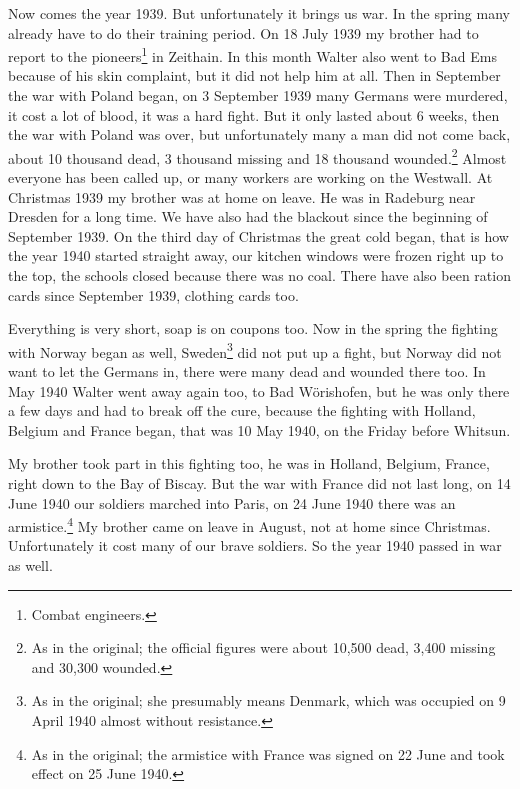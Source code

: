 \documentclass[a5paper,11pt,openany]{book}
\newcommand{\seite}[1]{\leavevmode\marginpar{\footnotesize\itshape\raggedright #1}\ignorespaces}
\begin{document}
Now comes the year 1939.
But unfortunately it brings us war.
In the spring many already have to do their training period.
On 18 July 1939 my brother had to report to the pioneers\footnote{Combat engineers.} in Zeithain.
In this month
\seite{47}
Walter also went to Bad Ems because of his skin complaint,
  but it did not help him at all.
Then in September the war with Poland began, on 3 September 1939 many Germans were murdered,
  it cost a lot of blood, it was a hard fight.
But it only lasted about 6 weeks, then the war with Poland was over, but unfortunately many a man did not come back,
  about 10 thousand dead, 3 thousand missing and 18 thousand wounded.\footnote{As in the original; the official figures were about 10,500 dead, 3,400 missing and 30,300 wounded.}
Almost everyone has been
\seite{48}
called up, or many workers are working on the Westwall.
At Christmas 1939 my brother was at home on leave.
He was in Radeburg near Dresden for a long time.
We have also had the blackout since the beginning of September 1939.
On the third day of Christmas the great cold began,
  that is how the year 1940 started straight away, our kitchen windows were frozen right up to the top,
  the schools closed because there was no coal.
There have also been ration cards since September 1939, clothing cards too.

\seite{49}
Everything is very short, soap is on coupons too.
Now in the spring the fighting with Norway began as well,
  Sweden\footnote{As in the original; she presumably means Denmark, which was occupied on 9 April 1940 almost without resistance.} did not put up a fight, but Norway did not want to let the Germans in,
  there were many dead and wounded there too.
In May 1940 Walter went away again too, to Bad Wörishofen,
  but he was only there a few days and had to break off the cure, because the fighting with Holland,
  Belgium and France began, that was 10 May 1940, on the Friday before Whitsun.

\seite{50}
My brother took part in this fighting too, he was in Holland, Belgium, France, right down to the Bay of Biscay.
But the war with France did not last long,
  on 14 June 1940 our soldiers marched into Paris, on 24 June 1940 there was an armistice.\footnote{As in the original; the armistice with France was signed on 22 June and took effect on 25 June 1940.}
My brother came on leave in August, not at home since Christmas.
Unfortunately it cost many of our brave soldiers.
So the year 1940 passed in war as well.
\end{document}
